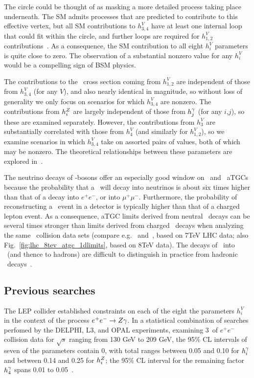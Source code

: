 The circle could be thought of as masking a more detailed process taking place underneath. The SM admits processes that are predicted to contribute
to this effective vertex, but all SM contributions to $h_{3,4}^{V}$ have at least one internal loop that could fit within the circle, and
further loops are required for $h_{1,2}^{V}$ contributions~\cite{ref:PhysRevD.47.4889}.
As a consequence, the SM contribution to all eight $h_{i}^{V}$ parameters is quite close to zero.
The observation of a substantial nonzero value for any $h_{i}^{V}$ would be a compelling sign of BSM physics.

The contributions to the \zinvg\ cross section coming from $h_{1,2}^{V}$ are independent of those from $h_{3,4}^{V}$ (for any $V$), and also nearly identical
in magnitude, so without loss of generality we only focus on scenarios for which $h_{3,4}^{V}$ are nonzero. The contributions
from $h_{i}^{Z}$ are largely independent of those from $h_{j}^{\gamma}$ (for any $i$,$j$), so these are examined separately.
However, the contributions from $h_{3}^{V}$ are substantially correlated with those from $h_{4}^{V}$ (and similarly for $h_{1,2}^{V}$), so we examine
scenarios in which $h_{3,4}^{V}$ take on assorted pairs of values, both of which may be nonzero. The theoretical relationships between these parameters
are explored in~\cite{ref:PhysRevD.47.4889}.

The neutrino decays of \PZ-bosons offer an especially good window on \PZ\PZ\Pgamma\ and \PZ\Pgamma\Pgamma\ aTGCs because the
probability that a \PZ\ will decay into neutrinos is about six times higher than that of a decay into $e^\mathrm{+}e^\mathrm{-}$, or into $\mu^\mathrm{+}\mu^\mathrm{-}$.
Furthermore, the probability of reconstructing a \zinvg\ event in a detector is typically
higher than that of a charged lepton event. As a consequence, aTGC limits derived from neutral \PZ\ decays can be several times
stronger than limits derived from charged \PZ\ decays when analyzing the same \Pp\Pp\ collision data sets (compare e.g.~\cite{ref:PhysRevD.89.092005} and~\cite{ref:JHEP10(2013)164},
based on 7\unit{TeV} LHC data; also Fig.~\ref{fig:lhc_8tev_atgc_1dlimits}, based on 8\unit{TeV} data).
The decays of \PZ\ into \Pq\Paq\ (and thence to hadrons) are difficult to distinguish in practice from hadronic \PW\ decays~\cite{ref:RevModPhys.89.035008}.

\subsection{Previous searches} \label{sec:introduction_aTGC_previous_searches}
The LEP collider established constraints on each of the eight the parameters $h_{i}^{V}$ in the context of the process $e^{\mathrm{+}}e^{\mathrm{-}} \to Z\gamma$.
In a statistical combination of searches perfomed by the DELPHI, L3, and OPAL experiments, examining 3\fbinv\ of $e^{\mathrm{+}}e^{\mathrm{-}}$ collision data
for $\sqrt{s}$ ranging from 130 GeV to 209 GeV, the 95\% CL intervals of seven of the parameters contain 0, with total ranges between 0.05 and 0.10 for $h_{i}^{\gamma}$
and between 0.14 and 0.25 for $h_{i}^{Z}$; the 95\% CL interval for the remaining factor $h_{4}^{\gamma}$ spans 0.01 to 0.05~\cite{ref:j.physrep.2013.07.004}.

